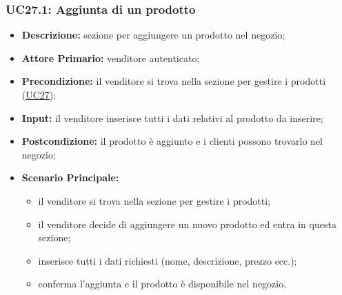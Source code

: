         \subsubsection{UC27.1: Aggiunta di un prodotto}
        \begin{itemize}
            \item \textbf{Descrizione:} sezione per aggiungere un prodotto nel negozio;
            \item \textbf{Attore Primario:} venditore autenticato;
            \item \textbf{Precondizione:} il venditore si trova nella sezione per gestire i prodotti (\hyperref[sec:UC27]{\underline{UC27}});
            \item \textbf{Input:} il venditore inserisce tutti i dati relativi al prodotto da inserire;
            \item \textbf{Postcondizione:} il prodotto è aggiunto e i clienti possono trovarlo nel negozio;
            \item \textbf{Scenario Principale:} 
                \begin{itemize}
                    \item il venditore si trova nella sezione per gestire i prodotti;
                    \item il venditore decide di aggiungere un nuovo prodotto ed entra in questa sezione;
                    \item inserisce tutti i dati richiesti (nome, descrizione, prezzo ecc.);
                    \item conferma l'aggiunta e il prodotto è disponibile nel negozio.
                \end{itemize}
        \end{itemize}

